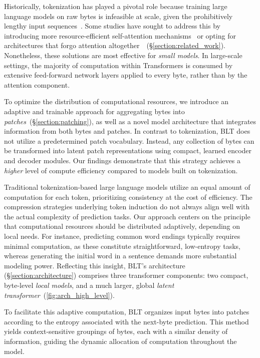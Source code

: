 Historically, tokenization has played a pivotal role because training large language models on raw bytes is infeasible at scale, given the prohibitively lengthy input sequences~\citep{xue2022byt5}. Some studies have sought to address this by introducing more resource-efficient self-attention mechanisms~\citep{el2020characterbert, clark2022canine} or opting for architectures that forgo attention altogether~\citep{wang2024mambabyte}~(\S\ref{section:related_work}). Nonetheless, these solutions are most effective for \textit{small models}. In large-scale settings, the majority of computation within Transformers is consumed by extensive feed-forward network layers applied to every byte, rather than by the attention component.

To optimize the distribution of computational resources, we introduce an adaptive and trainable approach for aggregating bytes into \textit{patches}~(\S\ref{section:patching}), as well as a novel model architecture that integrates information from both bytes and patches. In contrast to tokenization, {\textsc BLT} does not utilize a predetermined patch vocabulary. Instead, any collection of bytes can be transformed into latent patch representations using compact, learned encoder and decoder modules. Our findings demonstrate that this strategy achieves a \textit{higher} level of compute efficiency compared to models built on tokenization.

Traditional tokenization-based large language models utilize an equal amount of computation for each token, prioritizing consistency at the cost of efficiency. The compression strategies underlying token induction do not always align well with the actual complexity of prediction tasks. Our approach centers on the principle that computational resources should be distributed adaptively, depending on local needs. For instance, predicting common word endings typically requires minimal computation, as these constitute straightforward, low-entropy tasks, whereas generating the initial word in a sentence demands more substantial modeling power. Reflecting this insight, {\textsc BLT}'s architecture (\S\ref{section:architecture}) comprises three transformer components: two compact, byte-level \textit{local models}, and a much larger, global \textit{latent transformer}~(\autoref{fig:arch_high_level}). 

To facilitate this adaptive computation, {\textsc BLT} organizes input bytes into patches according to the entropy associated with the next-byte prediction. This method yields context-sensitive groupings of bytes, each with a similar density of information, guiding the dynamic allocation of computation throughout the model.

